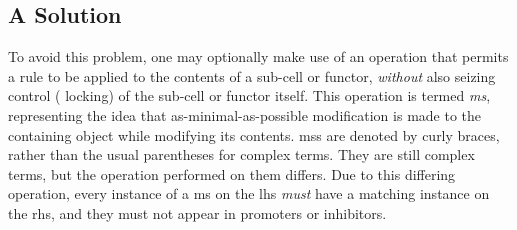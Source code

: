 \subsection{A Solution}
To avoid this problem, one may optionally make use of an operation that permits a rule to be applied to the contents of a sub-cell or functor, \emph{without} also seizing control (\ie{} locking) of the sub-cell or functor itself.  This operation is termed \emph{\gls{ms}}, representing the idea that as-minimal-as-possible modification is made to the containing object while modifying its contents.  \Glspl{ms} are denoted by curly braces, rather than the usual parentheses for complex terms.  They are still complex terms, but the operation performed on them differs.  Due to this differing operation, every instance of a \gls{ms} on the \gls{lhs} \emph{must} have a matching instance on the \gls{rhs}, and they must not appear in promoters or inhibitors.




\begin{cprulesetfloat}
    \begin{cpruleset}

    \end{cpruleset}
    \caption{\label{rules:cps:microsurg}Rules for a destructive multiplication process that requires exactly two steps regardless of the numbers multiplied by using \gls{cps} \glspl{ms}}
\end{cprulesetfloat}

